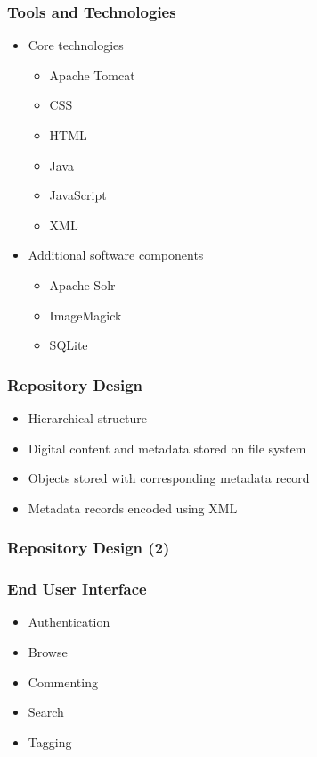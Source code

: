 \documentclass[xcolor=dvitex,t,11pt]{beamer}
\begin{document}
\begin{frame}[fragile]
\frametitle{Tools and Technologies}
\begin{itemize}
\item Core technologies
\begin{itemize}
\item Apache Tomcat
\item CSS
\item HTML
\item Java
\item JavaScript
\item XML
\end{itemize}
\item Additional software components
\begin{itemize}
\item Apache Solr
\item ImageMagick
\item SQLite
\end{itemize}
\end{itemize}
\end{frame}


\begin{frame}[fragile]
\frametitle{Repository Design}
\begin{figure}
\centering

\end{figure}
\begin{itemize}
\item Hierarchical structure
\item Digital content and metadata stored on file system
\item Objects stored with corresponding metadata record
\item Metadata records encoded using XML
\end{itemize}
\begin{figure}
\end{figure}
\end{frame}

\begin{frame}[fragile]
\frametitle{Repository Design (2)}
\begin{figure}
\centering

\end{figure}
\end{frame}

\begin{frame}[fragile]
\frametitle{End User Interface}
\begin{figure}
\centering

\end{figure}
\begin{itemize}
\item Authentication
\item Browse
\item Commenting
\item Search
\item Tagging
\end{itemize}
\end{frame}
\end{document}
